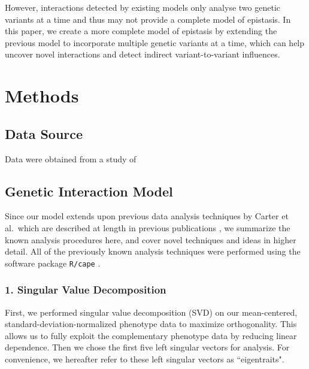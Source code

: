 \documentclass[letterpaper, 12pt]{article}
\begin{document}
However, interactions detected by existing models only analyse two genetic variants at a time and thus may not provide a complete model of epistasis. In this paper, we create a more complete model of epistasis by extending the previous model to incorporate multiple genetic variants at a time, which can help uncover novel interactions and detect indirect variant-to-variant influences. 


\begin{comment}
What are the ideas?
\begin{enumerate}
\item Advances in genomic/phenotypic technologies allow us to gather a lot of data which need new methods of studying \cite{tyler2013cape}
\item We want to map genetic networks using interaction analysis on a \textbf{genome-scale}. Has been done in yeast worm and fly. \cite{carter2013fly}
\item New mouse populations allow us to conduct interaction analysis in mammalian models for ``activation, repression, and pathway ordering" \cite{carter2012yeast}
\end{enumerate}
\end{comment}

\section*{Methods}
\subsection*{Data Source}
Data were obtained from a study of 

\subsection*{Genetic Interaction Model}
Since our model extends upon previous data analysis techniques by Carter et al.\ which are described at length in previous publications \cite{carter2013fly, carter2012yeast}, we summarize the known analysis procedures here, and cover novel techniques and ideas in higher detail. All of the previously known analysis techniques were performed using the software package \texttt{R/cape} \cite{tyler2013cape}.

\subsubsection*{1. Singular Value Decomposition}
First, we performed singular value decomposition (SVD) on our mean-centered, standard-deviation-normalized phenotype data to maximize orthogonality. This allows us to fully exploit the complementary phenotype data by reducing linear dependence. Then we chose the first five left singular vectors for analysis. For convenience, we hereafter refer to these left singular vectors as ``eigentraits".
\end{document}
